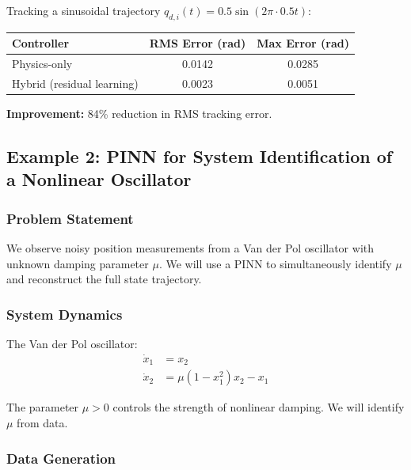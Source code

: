 Tracking a sinusoidal trajectory $q_{d,i}(t) = 0.5\sin(2\pi \cdot 0.5 t)$:

\begin{center}
\begin{tabular}{lcc}
\toprule
\textbf{Controller} & \textbf{RMS Error (rad)} & \textbf{Max Error (rad)} \\
\midrule
Physics-only & 0.0142 & 0.0285 \\
Hybrid (residual learning) & 0.0023 & 0.0051 \\
\bottomrule
\end{tabular}
\end{center}

\textbf{Improvement:} 84\% reduction in RMS tracking error.

\subsection{Example 2: PINN for System Identification of a Nonlinear Oscillator}
\label{ex:pinn_sysid}

\subsubsection{Problem Statement}

We observe noisy position measurements from a Van der Pol oscillator with unknown damping parameter $\mu$. We will use a PINN to simultaneously identify $\mu$ and reconstruct the full state trajectory.

\subsubsection{System Dynamics}

The Van der Pol oscillator:
\begin{align}
\dot{x}_1 &= x_2 \\
\dot{x}_2 &= \mu(1 - x_1^2)x_2 - x_1
\end{align}

The parameter $\mu > 0$ controls the strength of nonlinear damping. We will identify $\mu$ from data.

\subsubsection{Data Generation}

